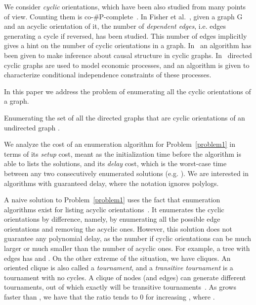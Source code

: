 \documentclass{llncs}
\begin{document}
We consider \emph{cyclic} orientations, which have been also studied
from many points of view. Counting them is
co-\#P-complete~\cite{linial1986hard}. In Fisher et
al.~\cite{Fisher199773}, given a graph G and an acyclic orientation of
it, the number of \emph{dependent edges}, i.e. edges generating a
cycle if reversed, has been studied.
This number of edges implicitly gives a hint on the number of
cyclic orientations in a graph. 
In~\cite{Richardson:1996:DAD:2074284.2074338} an algorithm has been
given to make inference about causal structure in cyclic
graphs. In~\cite{Spirtes:1995:DCG:2074158.2074214} directed cyclic
graphs are used to model economic processes, and an algorithm is given
to characterize conditional independence constraints of these
processes.

In this paper we address the problem of enumerating all the cyclic
orientations of a graph.
\begin{problem}
  Enumerating the set of all the directed graphs  that are
  cyclic orientations of an undirected graph .
\label{problem1}
\end{problem}

We analyze the cost of an enumeration algorithm for
Problem~\ref{problem1} in terms of its \emph{setup} cost, meant as the
initialization time before the algorithm is able to lists the
solutions, and its \emph{delay} cost, which is the worst-case time
between any two consecutively enumerated solutions
(e.g. \cite{JohnsonP88}). We are interested in algorithms with
guaranteed  delay, where the  notation ignores
polylogs.

A naive solution to Problem~\ref{problem1} uses the fact that
enumeration algorithms exist for listing acyclic
orientations~\cite{Barbosa199971,Squire1998275}. It enumerates the
cyclic orientations by difference, namely, by enumerating all the
 possible edge orientations and removing the  acyclic
ones. However, this solution does not guarantee any polynomial delay, as
the number  if cyclic orientations can be much
larger or much smaller than the number  of acyclic ones.  For
example, a tree with  edges has  and . On the
other extreme of the situation, we have cliques. An oriented clique is
also called a \textit{tournament}, and a \textit{transitive
  tournament} is a tournament with no cycles. A clique of  nodes
(and  edges) can generate  different
tournaments, out of which exactly  will be transitive
tournaments~\cite{moon1968topics}. As  grows faster than , we
have that the ratio  tends to 0 for increasing ,
where .
\end{document}
